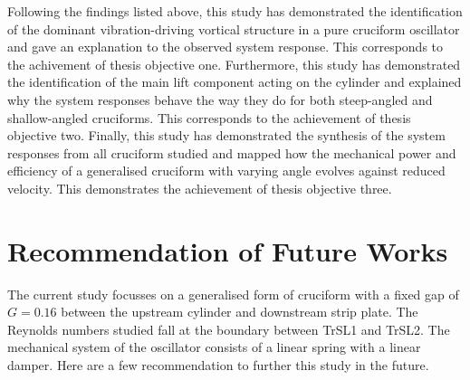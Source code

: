 \documentclass[oneside]{utmthesis}
\begin{document}

Following the findings listed above, this study has demonstrated the  identification of the dominant vibration-driving vortical structure in a pure cruciform oscillator and gave an explanation to the observed system response. This corresponds to the achivement of thesis objective one. Furthermore, this study has demonstrated the identification of the main lift component acting on the cylinder and explained why the system responses behave the way they do for both steep-angled and shallow-angled cruciforms. This corresponds to the achievement of thesis objective two. Finally, this study has demonstrated the synthesis of the system responses from all cruciform studied and mapped how the mechanical power and efficiency of a generalised cruciform with varying angle evolves against reduced velocity. This demonstrates the achievement of thesis objective three.

\section{Recommendation of Future Works} \label{sec:concFutureWorks}

The current study focusses on a generalised form of cruciform with a fixed gap of $G = 0.16$ between the upstream cylinder and downstream strip plate. The Reynolds numbers studied fall at the boundary between TrSL1 and TrSL2. The mechanical system of the oscillator consists of a linear spring with a linear damper. Here are a few recommendation to further this study in the future.
\end{document}
